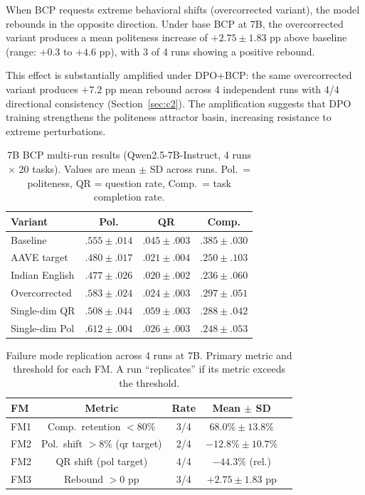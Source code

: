 \documentclass[11pt,a4paper]{article}
\begin{document}
When BCP requests extreme behavioral shifts (overcorrected variant), the model rebounds in the opposite direction. Under base BCP at 7B, the overcorrected variant produces a mean politeness increase of $+2.75 \pm 1.83$ pp above baseline (range: $+0.3$ to $+4.6$ pp), with 3 of 4 runs showing a positive rebound.

This effect is substantially amplified under DPO+BCP: the same overcorrected variant produces $+7.2$ pp mean rebound across 4 independent runs with 4/4 directional consistency (Section~\ref{sec:c2}). The amplification suggests that DPO training strengthens the politeness attractor basin, increasing resistance to extreme perturbations.

\begin{table}[t]
\centering
\caption{7B BCP multi-run results (Qwen2.5-7B-Instruct, 4 runs $\times$ 20 tasks). Values are mean $\pm$ SD across runs. Pol.\ = politeness, QR = question rate, Comp.\ = task completion rate.}
\label{tab:7b-multirun}
\small
\begin{tabular}{lccc}
\toprule
\textbf{Variant} & \textbf{Pol.} & \textbf{QR} & \textbf{Comp.} \\
\midrule
Baseline & $.555 \pm .014$ & $.045 \pm .003$ & $.385 \pm .030$ \\
AAVE target & $.480 \pm .017$ & $.021 \pm .004$ & $.250 \pm .103$ \\
Indian English & $.477 \pm .026$ & $.020 \pm .002$ & $.236 \pm .060$ \\
Overcorrected & $.583 \pm .024$ & $.024 \pm .003$ & $.297 \pm .051$ \\
Single-dim QR & $.508 \pm .044$ & $.059 \pm .003$ & $.288 \pm .042$ \\
Single-dim Pol & $.612 \pm .004$ & $.026 \pm .003$ & $.248 \pm .053$ \\
\bottomrule
\end{tabular}
\end{table}

\begin{table}[t]
\centering
\caption{Failure mode replication across 4 runs at 7B. Primary metric and threshold for each FM. A run ``replicates'' if its metric exceeds the threshold.}
\label{tab:fm-replication}
\small
\begin{tabular}{lcccc}
\toprule
\textbf{FM} & \textbf{Metric} & \textbf{Rate} & \textbf{Mean $\pm$ SD} \\
\midrule
FM1 & Comp.\ retention $< 80\%$ & 3/4 & $68.0\% \pm 13.8\%$ \\
FM2 & Pol.\ shift $> 8\%$ (qr target) & 2/4 & $-12.8\% \pm 10.7\%$ \\
FM2 & QR shift (pol target) & 4/4 & $-44.3\%$ (rel.) \\
FM3 & Rebound $> 0$ pp & 3/4 & $+2.75 \pm 1.83$ pp \\
\bottomrule
\end{tabular}
\end{table}
\end{document}
